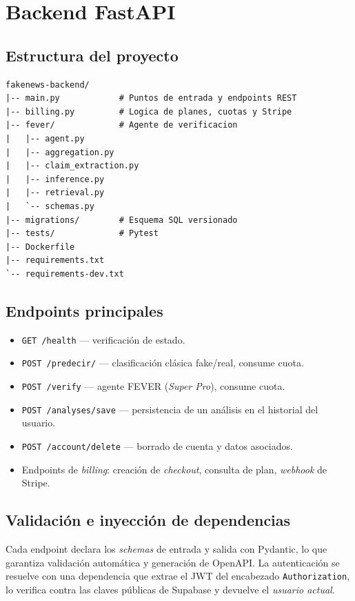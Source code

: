 \chapter{Backend FastAPI}\label{cap:backend}

\section{Estructura del proyecto}

\begin{lstlisting}[caption={Layout del backend}]
fakenews-backend/
|-- main.py            # Puntos de entrada y endpoints REST
|-- billing.py         # Logica de planes, cuotas y Stripe
|-- fever/             # Agente de verificacion
|   |-- agent.py
|   |-- aggregation.py
|   |-- claim_extraction.py
|   |-- inference.py
|   |-- retrieval.py
|   `-- schemas.py
|-- migrations/        # Esquema SQL versionado
|-- tests/             # Pytest
|-- Dockerfile
|-- requirements.txt
`-- requirements-dev.txt
\end{lstlisting}

\section{Endpoints principales}

\begin{itemize}[leftmargin=*,itemsep=0.2em]
  \item \texttt{GET /health} — verificación de estado.
  \item \texttt{POST /predecir/} — clasificación clásica fake/real,
        consume cuota.
  \item \texttt{POST /verify} — agente FEVER (\emph{Super Pro}),
        consume cuota.
  \item \texttt{POST /analyses/save} — persistencia de un análisis en
        el historial del usuario.
  \item \texttt{POST /account/delete} — borrado de cuenta y datos
        asociados.
  \item Endpoints de \emph{billing}: creación de \emph{checkout},
        consulta de plan, \emph{webhook} de Stripe.
\end{itemize}

\section{Validación e inyección de dependencias}

Cada endpoint declara los \emph{schemas} de entrada y salida con
Pydantic, lo que garantiza validación automática y generación de
OpenAPI. La autenticación se resuelve con una dependencia que extrae
el JWT del encabezado \texttt{Authorization}, lo verifica contra las
claves públicas de Supabase y devuelve el \emph{usuario actual}.

